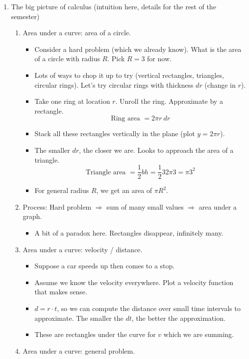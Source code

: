 \documentclass{article}
\begin{document}
\begin{enumerate}
\item The big picture of calculus (intuition here, details for the rest of the semester)
\begin{enumerate}
\item Area under a curve: area of a circle.
\begin{itemize}
\item Consider a hard problem (which we already know). What is the area of a circle with radius $R$. Pick $R=3$ for now. 
\item Lots of ways to chop it up to try (vertical rectangles, triangles, circular rings). Let's try circular rings with thickness $dr$ (change in $r$).
\item Take one ring at location $r$. Unroll the ring. Approximate by a rectangle. 
\[
\text{Ring area } = 2\pi r ~dr
\]
\item Stack all these rectangles vertically in the plane (plot $y=2\pi r$). 
\item The smaller $dr$, the closer we are. Looks to approach the area of a triangle.
\[
\text{Triangle area } = \frac{1}{2}bh = \frac{1}{2} 3 2\pi 3 = \pi 3^2
\]
\item For general radius $R$, we get an area of $\pi R^2$.
\end{itemize}
\item Process: Hard problem $\Rightarrow$ sum of many small values $\Rightarrow$ area under a graph. 
\begin{itemize}
\item A bit of a paradox here. Rectangles disappear, infinitely many.
\end{itemize}
\item Area under a curve: velocity / distance.
\begin{itemize}
\item Suppose a car speeds up then comes to a stop. 
\item Assume we know the velocity everywhere. Plot a velocity function that makes sense.
\item $d=r \cdot t$, so we can compute the distance over small time intervals to approximate. The smaller the $dt$, the better the approximation.
\item These are rectangles under the curve for $v$ which we are summing.
\end{itemize}
\item Area under a curve: general problem.

\end{enumerate}
\end{enumerate}
\end{document}
